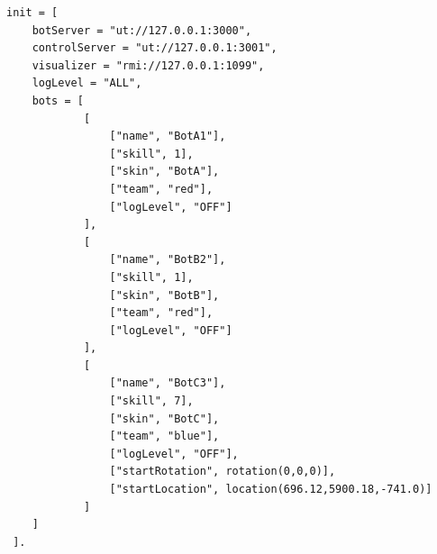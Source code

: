 \documentclass[11pt,a4paper]{article}
\begin{document}
\begin{verbatim}
init = [
    botServer = "ut://127.0.0.1:3000",
    controlServer = "ut://127.0.0.1:3001",
    visualizer = "rmi://127.0.0.1:1099",
    logLevel = "ALL", 
    bots = [
            [
                ["name", "BotA1"],
                ["skill", 1],
                ["skin", "BotA"], 
                ["team", "red"],
                ["logLevel", "OFF"]
            ],
            [
                ["name", "BotB2"],
                ["skill", 1],
                ["skin", "BotB"], 
                ["team", "red"],
                ["logLevel", "OFF"]
            ],
            [
                ["name", "BotC3"],
                ["skill", 7],
                ["skin", "BotC"], 
                ["team", "blue"],
                ["logLevel", "OFF"],
                ["startRotation", rotation(0,0,0)],
                ["startLocation", location(696.12,5900.18,-741.0)]
            ]
    ]
 ].
\end{verbatim}
\end{document}

